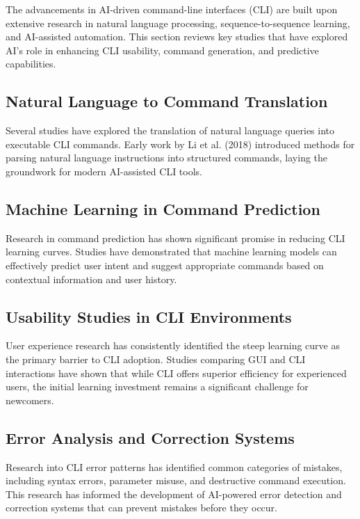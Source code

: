 The advancements in AI-driven command-line interfaces (CLI) are built upon extensive research in natural language processing, sequence-to-sequence learning, and AI-assisted automation. This section reviews key studies that have explored AI's role in enhancing CLI usability, command generation, and predictive capabilities.

\subsection{Natural Language to Command Translation}

Several studies have explored the translation of natural language queries into executable CLI commands. Early work by Li et al. (2018) introduced methods for parsing natural language instructions into structured commands, laying the groundwork for modern AI-assisted CLI tools.

\subsection{Machine Learning in Command Prediction}

Research in command prediction has shown significant promise in reducing CLI learning curves. Studies have demonstrated that machine learning models can effectively predict user intent and suggest appropriate commands based on contextual information and user history.

\subsection{Usability Studies in CLI Environments}

User experience research has consistently identified the steep learning curve as the primary barrier to CLI adoption. Studies comparing GUI and CLI interactions have shown that while CLI offers superior efficiency for experienced users, the initial learning investment remains a significant challenge for newcomers.

\subsection{Error Analysis and Correction Systems}

Research into CLI error patterns has identified common categories of mistakes, including syntax errors, parameter misuse, and destructive command execution. This research has informed the development of AI-powered error detection and correction systems that can prevent mistakes before they occur.

